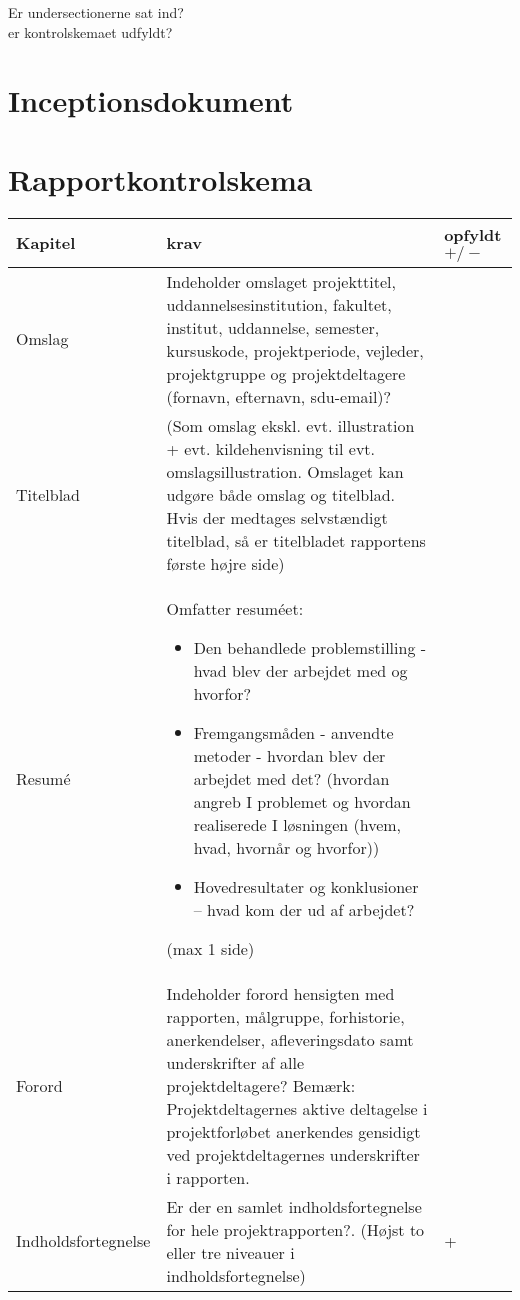 Er undersectionerne sat ind?\\
er kontrolskemaet udfyldt?


\section{Inceptionsdokument}

\section{Rapportkontrolskema}

\begin{center}
\begin{longtable}{| m{3.5cm} | m{10cm} | m{2.5cm} |}

\hline
Kapitel & krav & opfyldt $+/-$ \\ \hline
Omslag & Indeholder omslaget projekttitel, uddannelsesinstitution, fakultet, institut, uddannelse, semester, kursuskode, projektperiode, vejleder, projektgruppe og projektdeltagere (fornavn, efternavn, sdu-email)? & \\
\hline
Titelblad & (Som omslag ekskl. evt. illustration + evt. kildehenvisning til evt. omslagsillustration. Omslaget kan udgøre både omslag og titelblad. Hvis der medtages selvstændigt titelblad, så er titelbladet rapportens første højre side) & \\
\hline
Resumé & 
Omfatter resuméet:
\begin{itemize}
\item Den behandlede problemstilling - hvad blev der arbejdet med og hvorfor?
\item Fremgangsmåden - anvendte metoder - hvordan blev der arbejdet med det? 
(hvordan angreb I problemet og hvordan realiserede I løsningen (hvem, hvad, hvornår og hvorfor))
\item Hovedresultater og konklusioner  – hvad kom der ud af arbejdet?
\end{itemize}
(max  1 side)& \\
\hline
Forord & Indeholder forord hensigten med rapporten, målgruppe, forhistorie, anerkendelser, afleveringsdato samt underskrifter af alle projektdeltagere? \newline
Bemærk: Projektdeltagernes aktive deltagelse i projektforløbet anerkendes gensidigt ved projektdeltagernes underskrifter i rapporten. & \\
\hline
Indholdsfortegnelse & Er der en samlet indholdsfortegnelse for hele projektrapporten?. (Højst to eller tre niveauer i indholdsfortegnelse) & + \\

\end{longtable}
\end{center}
